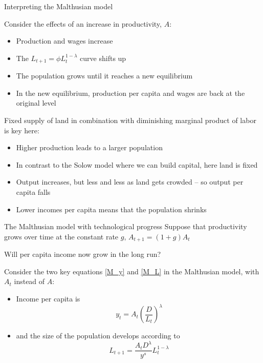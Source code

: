 \documentclass[10pt]{beamer}
\begin{document}
\begin{frame}{Interpreting the Malthusian model}

    Consider the effects of an increase in productivity, $A$:
    \begin{itemize}
        \item Production and wages increase
        \item The $L_{t+1}=\phi L_t^{1-\lambda}$ curve shifts up
        \item The population grows until it reaches a new equilibrium
        \item In the new equilibrium, production per capita and wages are back at the original level
    \end{itemize} \medskip

    Fixed supply of land in combination with diminishing marginal product of labor is key here:
    \begin{itemize}
        \item Higher production leads to a larger population
        \item In contrast to the Solow model where we can build capital, here land is fixed
        \item Output increases, but less and less as land gets crowded -- so output per capita falls
        \item Lower incomes per capita means that the population shrinks
    \end{itemize}
\end{frame}


\begin{frame}{The Malthusian model with technological progress}
    Suppose that productivity grows over time at the constant rate $g$, $A_{t+1}=(1+g)A_t$ \medskip

    Will per capita income now grow in the long run? \medskip \pause

    Consider the two key equations \eqref{M_y} and \eqref{M_L} in the Malthusian model, with $A_t$ instead of $A$:
    \begin{itemize}
        \item Income per capita is
            \begin{equation} \label{M_y2}
                y_t = A_t \left( \frac{D}{L_t} \right)^\lambda
            \end{equation} \small
        \item and the size of the population develops according to
            \begin{equation} \label{M_L2}
                 L_{t+1} = \frac{A_t D^\lambda}{y^s} L_t^{1-\lambda}
            \end{equation}
    \end{itemize}
\end{frame}
\end{document}
